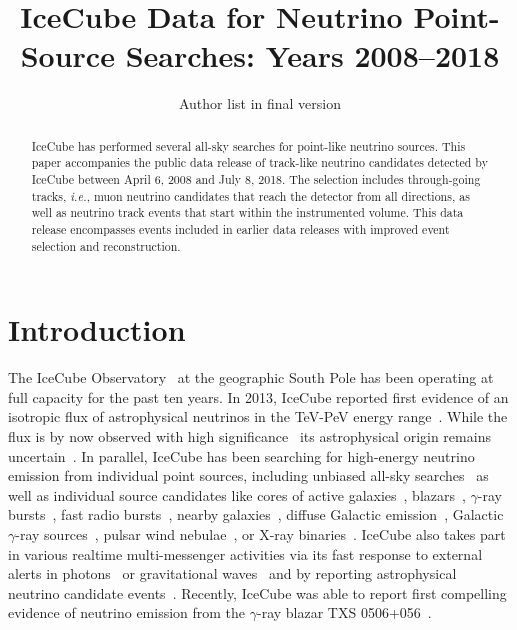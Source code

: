 \documentclass[aps,10pt,prd,twocolumn,floats,letterpaper,showpacs,nofootinbib,bibnotes,notitlepage,superscriptaddress,floatfix]{revtex4-1}
\begin{document}
\title{IceCube Data for Neutrino Point-Source Searches: Years 2008--2018}

\author{Author list in final version}
%
\noaffiliation

\pacs{}

\begin{abstract}
IceCube has performed several all-sky searches for point-like neutrino sources. This paper accompanies the public data release of track-like neutrino candidates detected by IceCube between April 6, 2008 and July 8, 2018. The selection includes through-going tracks, {\it i.e.}, muon neutrino candidates that reach the detector from all directions, as well as neutrino track events that start within the instrumented volume. This data release encompasses events included in earlier data releases with improved event selection and reconstruction.
\end{abstract}

\maketitle

\section{Introduction}

The IceCube Observatory~\cite{Aartsen:2016nxy} at the geographic South Pole has been operating at full capacity for the past ten years. In 2013, IceCube reported first evidence of an isotropic flux of astrophysical neutrinos in the TeV-PeV energy range~\cite{Aartsen:2013bka,Aartsen:2013jdh}. While the flux is by now observed with high significance~\cite{Aartsen:2014gkd,Aartsen:2015rwa,Aartsen:2016xlq,Aartsen:2020csc} its astrophysical origin remains uncertain~\cite{Ahlers:2018fkn}. In parallel, IceCube has been searching for high-energy neutrino emission from individual point sources, including unbiased all-sky searches~\cite{Abbasi:2010rd,Aartsen:2013uuv,Aartsen:2014cva,Aartsen:2014cva,Aartsen:2018ywr,Aartsen:2019fau} as well as individual source candidates like cores of active galaxies~\cite{Bradascio:2019xdd}, blazars~\cite{Aartsen:2016lir}, $\gamma$-ray bursts~\cite{Abbasi:2012zw,Aartsen:2014aqy,Aartsen:2016qcr,Aartsen:2017wea}, fast radio bursts~\cite{Aartsen:2017zvw}, nearby galaxies~\cite{Aartsen:2019xkn}, diffuse Galactic emission~\cite{Albert:2018vxw}, Galactic $\gamma$-ray sources~\cite{Kheirandish:2019bke}, pulsar wind nebulae~\cite{Aartsen:2020eof}, or X-ray binaries~\cite{Abbasi:2011ke}. IceCube also takes part in various realtime multi-messenger activities via its fast response to external alerts in photons~\cite{Abbasi:2011ja,Aartsen:2015trq} or gravitational waves~\cite{Adrian-Martinez:2016xgn,ANTARES:2017iky,Aartsen:2020mla} and by reporting astrophysical neutrino candidate events~\cite{Aartsen:2016lmt,AyalaSolares:2020ing}. Recently, IceCube was able to report first compelling evidence of neutrino emission from the $\gamma$-ray blazar TXS 0506+056~\cite{Finley:2019vpk,IceCube:2018dnn,IceCube:2018cha}.
\end{document}
